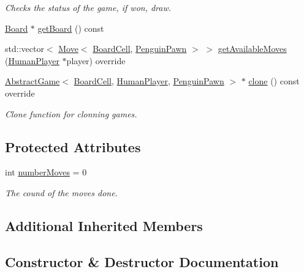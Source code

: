 \begin{DoxyCompactItemize}
\begin{DoxyCompactList}\small\item\em Checks the status of the game, if won, draw. \end{DoxyCompactList}\item 
\hyperlink{classgame_1_1penguin_1_1_board}{Board} $\ast$ \hyperlink{classgame_1_1penguin_1_1_penguin_game_a7b65d0a9742a9cf07296839373a56143}{get\+Board} () const
\item 
std\+::vector$<$ \hyperlink{structgame_1_1_move}{Move}$<$ \hyperlink{classgame_1_1penguin_1_1_board_cell}{Board\+Cell}, \hyperlink{classgame_1_1penguin_1_1_penguin_pawn}{Penguin\+Pawn} $>$ $>$ \hyperlink{classgame_1_1penguin_1_1_penguin_game_ae92f96626c8d88f77279b6a76822fbe0}{get\+Available\+Moves} (\hyperlink{classgame_1_1penguin_1_1_human_player}{Human\+Player} $\ast$player) override
\item 
\hyperlink{classgame_1_1_abstract_game}{Abstract\+Game}$<$ \hyperlink{classgame_1_1penguin_1_1_board_cell}{Board\+Cell}, \hyperlink{classgame_1_1penguin_1_1_human_player}{Human\+Player}, \hyperlink{classgame_1_1penguin_1_1_penguin_pawn}{Penguin\+Pawn} $>$ $\ast$ \hyperlink{classgame_1_1penguin_1_1_penguin_game_af4277cfe44814a9b99051348f25ce264}{clone} () const override
\begin{DoxyCompactList}\small\item\em Clone function for clonning games. \end{DoxyCompactList}\end{DoxyCompactItemize}
\subsection*{Protected Attributes}
\begin{DoxyCompactItemize}
\item 
int \hyperlink{classgame_1_1penguin_1_1_penguin_game_a52d749e098b76c888b9891f339b22f81}{number\+Moves} = 0
\begin{DoxyCompactList}\small\item\em The cound of the moves done. \end{DoxyCompactList}\end{DoxyCompactItemize}
\subsection*{Additional Inherited Members}


\subsection{Constructor \& Destructor Documentation}
\mbox{\label{classgame_1_1penguin_1_1_penguin_game_ad5bc5305347a5c28df1f41407e53303c}} 
